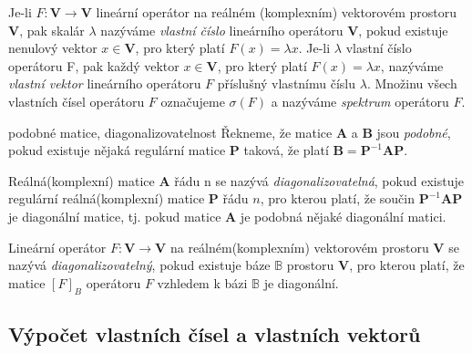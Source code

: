 \begin{definice}
Je-li $F:\textbf{V}\rightarrow$\textbf{V} lineární operátor na reálném (komplexním) vektorovém prostoru \textbf{V}, pak skalár $\lambda$ nazýváme \emph{vlastní číslo} lineárního operátoru \textbf{V}, pokud existuje nenulový vektor $x \in \textbf{V}$, pro který platí $F(x)=\lambda x$.
Je-li $\lambda$ vlastní číslo operátoru F, pak každý vektor $x \in \textbf{V}$, pro který platí $F(x)=\lambda x$, nazýváme \emph{vlastní vektor} lineárního operátoru $F$ příslušný vlastnímu číslu $\lambda$.
Množinu všech vlastních čísel operátoru $F$ označujeme $\sigma(F)$ a nazýváme \emph{spektrum} operátoru $F$.
\end{definice}

\begin{definiceN}{podobné matice, diagonalizovatelnost}
Řekneme, že matice \textbf{A} a \textbf{B} jsou \emph{podobné}, pokud existuje nějaká regulární matice \textbf{P} taková, že platí $\textbf{B}=\textbf{P}^{-1}\textbf{A}\textbf{P}$.

Reálná(komplexní) matice \textbf{A} řádu n  se nazývá \emph{diagonalizovatelná}, pokud existuje regulární reálná(komplexní) matice \textbf{P} řádu $n$, pro kterou platí, že součin $\textbf{P}^{-1}\textbf{A}\textbf{P}$ je diagonální matice, tj. pokud matice \textbf{A} je podobná nějaké diagonální matici.

Lineární operátor $F:\textbf{V}\rightarrow$\textbf{V} na reálném(komplexním) vektorovém prostoru \textbf{V} se nazývá \emph{diagonalizovatelný}, pokud existuje báze $\mathbb{B}$ prostoru \textbf{V}, pro kterou platí, že matice $[F]_B$ operátoru $F$ vzhledem k bázi $\mathbb{B}$ je diagonální.
\end{definiceN}

\subsection{Výpočet vlastních čísel a vlastních vektorů }

